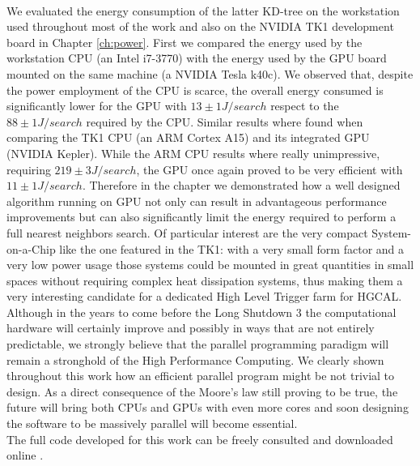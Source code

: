 \vspace{0.5cm}
\\
We evaluated the energy consumption of the latter KD-tree on the workstation used throughout most of the work and also on the NVIDIA TK1 development board in Chapter \ref{ch:power}. First we compared the energy used by the workstation CPU (an Intel i7-3770) with the energy used by the GPU board mounted on the same machine (a NVIDIA Tesla k40c). We observed that, despite the power employment of the CPU is scarce, the overall energy consumed is significantly lower for the GPU with $13 \pm 1 \unit{J/search}$ respect to the $88 \pm 1 \unit{J/search}$ required by the CPU. Similar results where found when comparing the TK1 CPU (an ARM Cortex A15) and its integrated GPU (NVIDIA Kepler). While the ARM CPU results where really unimpressive, requiring $219 \pm 3 \unit{J/search}$, the GPU once again proved to be very efficient with $11 \pm 1 \unit{J/search}$. Therefore in the chapter we demonstrated how a well designed algorithm running on GPU not only can result in advantageous performance improvements but can also significantly limit the energy required to perform a full nearest neighbors search. Of particular interest are the very compact System-on-a-Chip like the one featured in the TK1: with a very small form factor and a very low power usage those systems could be mounted in great quantities in small spaces without requiring complex heat dissipation systems, thus making them a very interesting candidate for a dedicated High Level Trigger farm for HGCAL.
\vspace{0.5cm}
\\
Although in the years to come before the Long Shutdown 3 the computational hardware will certainly improve and possibly in ways that are not entirely predictable, we strongly believe that the parallel programming paradigm will remain a stronghold of the High Performance Computing. We clearly shown throughout this work how an efficient parallel program might be not trivial to design. As a direct consequence of the Moore's law still proving to be true, the future will bring both CPUs and GPUs with even more cores and soon designing the software to be massively parallel will become essential.
\vspace{0.5cm}
\\
The full code developed for this work can be freely consulted and downloaded online \cite{github}.